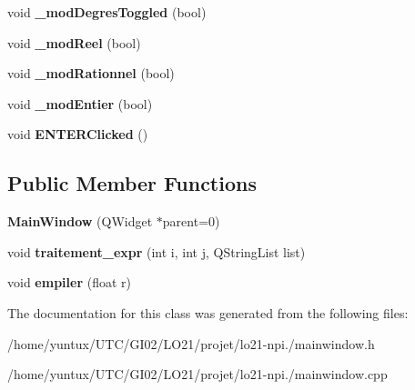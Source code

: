 \begin{DoxyCompactItemize}
\item 
\hypertarget{class_main_window_aa181a30bc86fd676299a828b6806fff7}{void {\bfseries \-\_\-mod\-Degres\-Toggled} (bool)}\label{class_main_window_aa181a30bc86fd676299a828b6806fff7}

\item 
\hypertarget{class_main_window_a29e8205bc963cebba7a96f94f4d3c40f}{void {\bfseries \-\_\-mod\-Reel} (bool)}\label{class_main_window_a29e8205bc963cebba7a96f94f4d3c40f}

\item 
\hypertarget{class_main_window_af8e967129145a378e37fc2ff4eb1379c}{void {\bfseries \-\_\-mod\-Rationnel} (bool)}\label{class_main_window_af8e967129145a378e37fc2ff4eb1379c}

\item 
\hypertarget{class_main_window_a05cfdc8bf99fa145e67ce4d9eed03f20}{void {\bfseries \-\_\-mod\-Entier} (bool)}\label{class_main_window_a05cfdc8bf99fa145e67ce4d9eed03f20}

\item 
\hypertarget{class_main_window_a0ae0ae526c8fcc96c7f32fc3b3727224}{void {\bfseries \-E\-N\-T\-E\-R\-Clicked} ()}\label{class_main_window_a0ae0ae526c8fcc96c7f32fc3b3727224}

\end{DoxyCompactItemize}
\subsection*{\-Public \-Member \-Functions}
\begin{DoxyCompactItemize}
\item 
\hypertarget{class_main_window_a8b244be8b7b7db1b08de2a2acb9409db}{{\bfseries \-Main\-Window} (\-Q\-Widget $\ast$parent=0)}\label{class_main_window_a8b244be8b7b7db1b08de2a2acb9409db}

\item 
\hypertarget{class_main_window_a2a1ee33b84e16a22e7656bc43220483d}{void {\bfseries traitement\-\_\-expr} (int i, int j, \-Q\-String\-List list)}\label{class_main_window_a2a1ee33b84e16a22e7656bc43220483d}

\item 
\hypertarget{class_main_window_a71be435db24c12ee4c320a16a0b33ef6}{void {\bfseries empiler} (float r)}\label{class_main_window_a71be435db24c12ee4c320a16a0b33ef6}

\end{DoxyCompactItemize}


\-The documentation for this class was generated from the following files\-:\begin{DoxyCompactItemize}
\item 
/home/yuntux/\-U\-T\-C/\-G\-I02/\-L\-O21/projet/lo21-\/npi./mainwindow.\-h\item 
/home/yuntux/\-U\-T\-C/\-G\-I02/\-L\-O21/projet/lo21-\/npi./mainwindow.\-cpp\end{DoxyCompactItemize}
